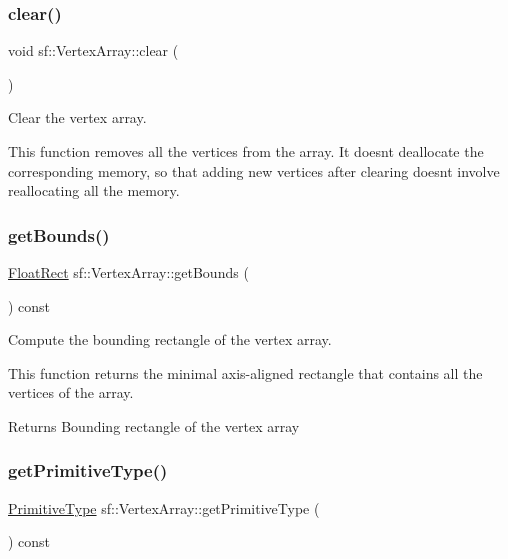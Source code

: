 \subsubsection{\texorpdfstring{clear()}{clear()}}
{\footnotesize\ttfamily void sf\+::\+Vertex\+Array\+::clear (\begin{DoxyParamCaption}{ }\end{DoxyParamCaption})}



Clear the vertex array. 

This function removes all the vertices from the array. It doesn\textquotesingle{}t deallocate the corresponding memory, so that adding new vertices after clearing doesn\textquotesingle{}t involve reallocating all the memory. \mbox{\label{classsf_1_1_vertex_array_abd57744c732abfc7d4c98d8e1d4ccca1}} 
\subsubsection{\texorpdfstring{get\+Bounds()}{getBounds()}}
{\footnotesize\ttfamily \hyperlink{classsf_1_1_rect}{Float\+Rect} sf\+::\+Vertex\+Array\+::get\+Bounds (\begin{DoxyParamCaption}{ }\end{DoxyParamCaption}) const}



Compute the bounding rectangle of the vertex array. 

This function returns the minimal axis-\/aligned rectangle that contains all the vertices of the array.

\begin{DoxyReturn}{Returns}
Bounding rectangle of the vertex array 
\end{DoxyReturn}
\mbox{\label{classsf_1_1_vertex_array_aa1a60d84543aa6e220683349b645f130}} 
\subsubsection{\texorpdfstring{get\+Primitive\+Type()}{getPrimitiveType()}}
{\footnotesize\ttfamily \hyperlink{group__graphics_ga5ee56ac1339984909610713096283b1b}{Primitive\+Type} sf\+::\+Vertex\+Array\+::get\+Primitive\+Type (\begin{DoxyParamCaption}{ }\end{DoxyParamCaption}) const}



